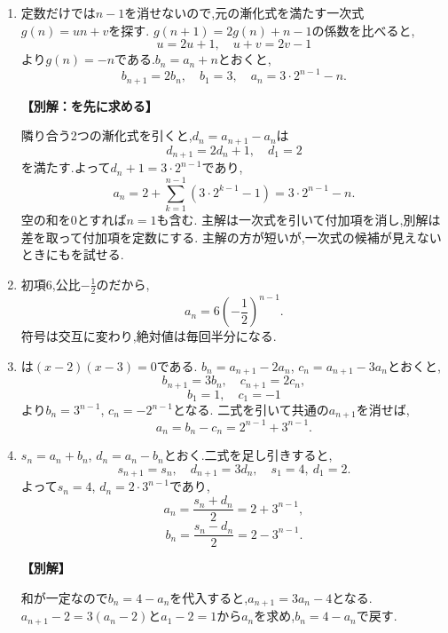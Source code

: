 \begin{enumerate}[label=\textbf{問\arabic*.},leftmargin=3.8em,format=\bookitemlink{practice-basic}{solution}{problem}]
  \item {}\BookMathLayout{}{\\}
    定数だけでは$n-1$を消せないので,元の漸化式を満たす一次式$g(n)=un+v$を探す.
    $g(n+1)=2g(n)+n-1$の係数を比べると,
    \[
      u=2u+1,\quad u+v=2v-1
    \]
    より$g(n)=-n$である.$b_n=a_n+n$とおくと,
    \[
      b_{n+1}=2b_n,\quad b_1=3,\quad a_n=3\cdot2^{n-1}-n.
    \]
    \par\smallskip\noindent\textbf{【別解：を先に求める】}\par
    隣り合う2つの漸化式を引くと,$d_n=a_{n+1}-a_n$は
    \[
      d_{n+1}=2d_n+1,\quad d_1=2
    \]
    を満たす.よって$d_n+1=3\cdot2^{n-1}$であり,
    \[
      a_n=2+\sum_{k=1}^{n-1}(3\cdot2^{k-1}-1)
      =3\cdot2^{n-1}-n.
    \]
    空の和を$0$とすれば$n=1$も含む.
    主解は一次式を引いて付加項を消し,別解は差を取って付加項を定数にする.
    主解の方が短いが,一次式の候補が見えないときにもを試せる.

  \item {}\BookMathLayout{}{\\}
    初項$6$,公比$-\frac{1}{2}$のだから,
    \[
      a_n=6\left(-\frac12\right)^{n-1}.
    \]
    符号は交互に変わり,絶対値は毎回半分になる.

  \item {}\BookMathLayout{}{\\}
    は$(x-2)(x-3)=0$である.
    $b_n=a_{n+1}-2a_n$, $c_n=a_{n+1}-3a_n$とおくと,
    \[
      b_{n+1}=3b_n,\quad c_{n+1}=2c_n,
    \]
    \[
      b_1=1,\quad c_1=-1
    \]
    より$b_n=3^{n-1}$, $c_n=-2^{n-1}$となる.
    二式を引いて共通の$a_{n+1}$を消せば,
    \[
      a_n=b_n-c_n=2^{n-1}+3^{n-1}.
    \]

  \item {}\BookMathLayout{}{\\}
    $s_n=a_n+b_n$, $d_n=a_n-b_n$とおく.二式を足し引きすると,
    \[
      s_{n+1}=s_n,\quad d_{n+1}=3d_n,\quad s_1=4,\ d_1=2.
    \]
    よって$s_n=4$, $d_n=2\cdot3^{n-1}$であり,
    \[
      a_n=\frac{s_n+d_n}{2}=2+3^{n-1},
    \]
    \[
      b_n=\frac{s_n-d_n}{2}=2-3^{n-1}.
    \]
    \par\smallskip\noindent\textbf{【別解】}\par
    和が一定なので$b_n=4-a_n$を代入すると,$a_{n+1}=3a_n-4$となる.
    $a_{n+1}-2=3(a_n-2)$と$a_1-2=1$から$a_n$を求め,$b_n=4-a_n$で戻す.


\end{enumerate}
